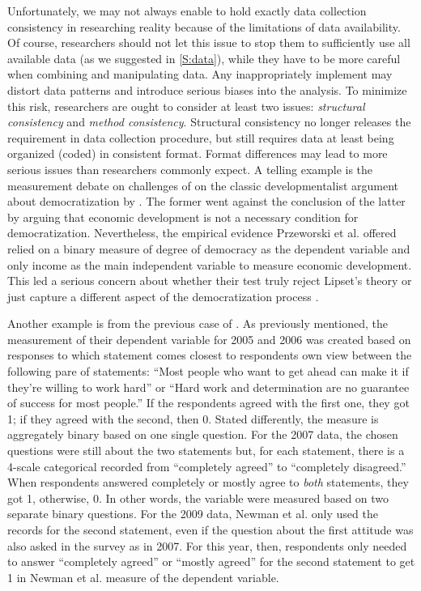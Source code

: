 Unfortunately, we may not always enable to hold exactly data collection consistency in researching reality because of the limitations of data availability. Of course, researchers should not let this issue to stop them to sufficiently use all available data (as we suggested in \cref{S:data}), while they have to be more careful when combining and manipulating data. Any inappropriately implement may distort data patterns and introduce serious biases into the analysis. To minimize this risk, researchers are ought to consider at least two issues: \textit{structural consistency} and \textit{method consistency}. Structural consistency no longer releases the requirement in data collection procedure, but still requires data at least being organized (coded) in consistent format. Format differences may lead to more serious issues than researchers commonly expect. A telling example is the measurement debate on challenges of \cite{Przeworski2000} on the classic developmentalist argument about democratization by \cite{Lipset1960}. The former went against the conclusion of the latter by arguing that economic development is not a necessary condition for democratization. Nevertheless, the empirical evidence Przeworski et al. offered relied on a binary measure of degree of democracy as the dependent variable and only income as the main independent variable to measure economic development. This led a serious concern about whether their test truly reject Lipset's theory or just capture a different aspect of the democratization process \cite[not very sure if this citation is adequate][]{Bernhagen2009}. 

Another example is from the previous case of \cite{Newman2015}. As previously mentioned, the measurement of their dependent variable for 2005 and 2006 was created based on responses to which statement comes closest to respondents own view between the following pare of statements: ``Most people who want to get ahead can make it if they're willing to work hard'' or ``Hard work and determination are no guarantee of success for most people.'' If the respondents agreed with the first one, they got 1; if they agreed with the second, then 0. Stated differently, the measure is aggregately binary based on one single question. For the 2007 data, the chosen questions were still about the two statements but, for each statement, there is a 4-scale categorical recorded from ``completely agreed'' to ``completely disagreed.'' When respondents answered completely or mostly agree to \textit{both} statements, they got 1, otherwise, 0. In other words, the variable were measured based on two separate binary questions. For the 2009 data, Newman et al. only used the records for the second statement, even if the question about the first attitude was also asked in the survey as in 2007. For this year, then, respondents only needed to answer ``completely agreed'' or ``mostly agreed'' for the second statement to get 1 in Newman et al. measure of the dependent variable. 

